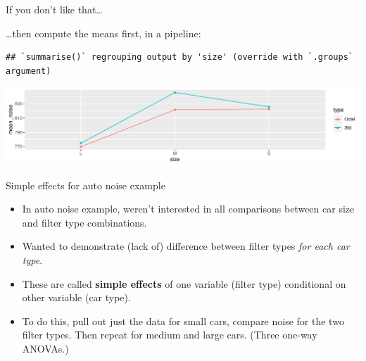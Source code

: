 \documentclass[
  ignorenonframetext,
]{beamer}
\newenvironment{Shaded}{\begin{snugshade}}{\end{snugshade}}
\newcommand{\DataTypeTok}[1]{\textcolor[rgb]{0.13,0.29,0.53}{#1}}
\newcommand{\KeywordTok}[1]{\textcolor[rgb]{0.13,0.29,0.53}{\textbf{#1}}}
\newcommand{\NormalTok}[1]{#1}
\newcommand{\OperatorTok}[1]{\textcolor[rgb]{0.81,0.36,0.00}{\textbf{#1}}}
\newcommand{\StringTok}[1]{\textcolor[rgb]{0.31,0.60,0.02}{#1}}
\begin{document}
\begin{frame}[fragile]{If you don't like that\ldots}
\protect\hypertarget{if-you-dont-like-that}{}

\ldots then compute the means first, in a pipeline:

\footnotesize

\begin{Shaded}
\end{Shaded}

\begin{verbatim}
## `summarise()` regrouping output by 'size' (override with `.groups` argument)
\end{verbatim}

\includegraphics{slides_d29_files/figure-beamer/unnamed-chunk-217-1.pdf}

\normalsize

\end{frame}

\begin{frame}{Simple effects for auto noise example}
\protect\hypertarget{simple-effects-for-auto-noise-example}{}

\begin{itemize}
\item
  In auto noise example, weren't interested in all comparisons between
  car size and filter type combinations.
\item
  Wanted to demonstrate (lack of) difference between filter types
  \emph{for each car type}.
\item
  These are called \textbf{simple effects} of one variable (filter type)
  conditional on other variable (car type).
\item
  To do this, pull out just the data for small cars, compare noise for
  the two filter types. Then repeat for medium and large cars. (Three
  one-way ANOVAs.)
\end{itemize}

\end{frame}
\end{document}
